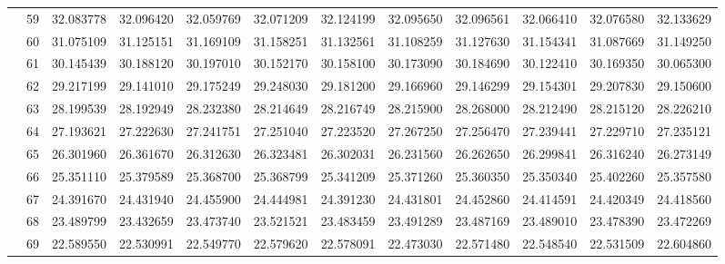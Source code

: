 \begin{table}[h]
{\begin{tabular}{cc|cccccccccc}
\multicolumn{1}{|c|}{} & 59 & 32.083778 & 32.096420 & 32.059769 & 32.071209 & 32.124199 & 32.095650 & 32.096561 & 32.066410 & 32.076580 & 32.133629 \\ \cline{2-2}
\multicolumn{1}{|c|}{} & 60 & 31.075109 & 31.125151 & 31.169109 & 31.158251 & 31.132561 & 31.108259 & 31.127630 & 31.154341 & 31.087669 & 31.149250 \\ \cline{2-2}
\multicolumn{1}{|c|}{} & 61 & 30.145439 & 30.188120 & 30.197010 & 30.152170 & 30.158100 & 30.173090 & 30.184690 & 30.122410 & 30.169350 & 30.065300 \\ \cline{2-2}
\multicolumn{1}{|c|}{} & 62 & 29.217199 & 29.141010 & 29.175249 & 29.248030 & 29.181200 & 29.166960 & 29.146299 & 29.154301 & 29.207830 & 29.150600 \\ \cline{2-2}
\multicolumn{1}{|c|}{} & 63 & 28.199539 & 28.192949 & 28.232380 & 28.214649 & 28.216749 & 28.215900 & 28.268000 & 28.212490 & 28.215120 & 28.226210 \\ \cline{2-2}
\multicolumn{1}{|c|}{} & 64 & 27.193621 & 27.222630 & 27.241751 & 27.251040 & 27.223520 & 27.267250 & 27.256470 & 27.239441 & 27.229710 & 27.235121 \\ \cline{2-2}
\multicolumn{1}{|c|}{} & 65 & 26.301960 & 26.361670 & 26.312630 & 26.323481 & 26.302031 & 26.231560 & 26.262650 & 26.299841 & 26.316240 & 26.273149 \\ \cline{2-2}
\multicolumn{1}{|c|}{} & 66 & 25.351110 & 25.379589 & 25.368700 & 25.368799 & 25.341209 & 25.371260 & 25.360350 & 25.350340 & 25.402260 & 25.357580 \\ \cline{2-2}
\multicolumn{1}{|c|}{} & 67 & 24.391670 & 24.431940 & 24.455900 & 24.444981 & 24.391230 & 24.431801 & 24.452860 & 24.414591 & 24.420349 & 24.418560 \\ \cline{2-2}
\multicolumn{1}{|c|}{} & 68 & 23.489799 & 23.432659 & 23.473740 & 23.521521 & 23.483459 & 23.491289 & 23.487169 & 23.489010 & 23.478390 & 23.472269 \\ \cline{2-2}
\multicolumn{1}{|c|}{} & 69 & 22.589550 & 22.530991 & 22.549770 & 22.579620 & 22.578091 & 22.473030 & 22.571480 & 22.548540 & 22.531509 & 22.604860 \\ \cline{1-2}
\end{tabular}%
}
\end{table}

